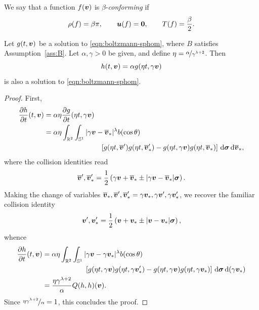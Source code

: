 \begin{definition} \label{def:conf}
    We say that a function $f({\bm v})$ is $\beta$-{\em conforming} if
    \[
        \rho(f) = \beta\pi, \qquad
        {\bm u}(f) = {\bm0}, \qquad
        T(f) = \frac{\beta}{2}.
    \]
\end{definition}

\begin{theorem} \label{thm:trf-sols}
    Let $g(t,{\bm v})$ be a solution to \eqref{eqn:boltzmann-sphom}, where $B$ satisfies Assumption~\ref{ass:B}.
    Let $\alpha,\gamma > 0$ be given, and define $\eta = \nicefrac{\alpha}{\gamma^{\lambda+2}}$. Then
    \[
        h(t,{\bm v}) = \alpha g(\eta t, \gamma {\bm v})
    \]
    is also a solution to \eqref{eqn:boltzmann-sphom}.
\end{theorem}
\begin{proof}
    First,
    \begin{align*}
        \frac{\partial h}{\partial t}(t,{\bm v})
        &= \alpha\eta \frac{\partial g}{\partial t}(\eta t, \gamma {\bm v}) \\
        &= \alpha\eta \int_{\mathbb{R}^2}\int_{\mathbb{S}^1} |\gamma{\bm v}-\overline{{\bm v}}_\ast|^\lambda b(\cos\theta) \\
        & \qquad\qquad\qquad\qquad
            \left[ g(\eta t,\overline{{\bm v}}') g(\eta t,\overline{{\bm v}}_\ast') -
                   g(\eta t,\gamma{\bm v}) g(\eta t,\overline{{\bm v}}_\ast) \right]
            \,\mathrm{d}{\bm\sigma} \,\mathrm{d}\overline{{\bm v}}_\ast,
    \end{align*}
    where the collision identities read
    \[
        \overline{{\bm v}}', \overline{{\bm v}}_\ast' = \frac{1}{2}\left(
        \gamma{\bm v}+\overline{{\bm v}}_\ast \pm |\gamma{\bm v}-\overline{{\bm v}}_\ast|{\bm\sigma} \right).
    \]
    Making the change of variables $\overline{{\bm v}}_\ast, \overline{{\bm v}}', \overline{{\bm v}}_\ast'
    = \gamma{\bm v}_\ast, \gamma{\bm v}', \gamma{\bm v}_\ast'$, we recover the familiar collision identity
    \[
        {\bm v}', {\bm v}_\ast' = \frac{1}{2}\left(
        {\bm v}+{\bm v}_\ast \pm |{\bm v}-{\bm v}_\ast|{\bm\sigma} \right),
    \]
    whence
    \begin{align*}
        \frac{\partial h}{\partial t}(t,{\bm v})
        &= \alpha\eta \int_{\mathbb{R}^2}\int_{\mathbb{S}^1} |\gamma{\bm v}-\gamma{\bm v}_\ast|^\lambda b(\cos\theta) \\
        & \qquad\qquad\qquad
            \left[ g(\eta t,\gamma{\bm v}) g(\eta t,\gamma{\bm v}_\ast') -
                   g(\eta t,\gamma{\bm v}) g(\eta t,\gamma{\bm v}_\ast) \right]
            \,\mathrm{d}{\bm\sigma} \,\mathrm{d}(\gamma{\bm v}_\ast) \\
        &= \frac{\eta\gamma^{\lambda+2}}{\alpha} Q(h,h)({\bm v}).
    \end{align*}
    Since $\nicefrac{\eta\gamma^{\lambda+2}}{\alpha}=1$, this concludes the proof.
\end{proof}

